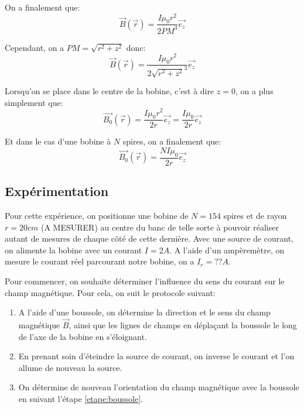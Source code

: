 \documentclass[12pt]{article}
\begin{document}
On a finalement que:
\begin{equation}
    \vec{B}(\vec{r}) = \frac{I \mu_0 r^2}{2 PM^3} \vec{e_z}
\end{equation}

Cependant, on a $PM = \sqrt{r^2 + z^2}$ donc:
\begin{equation}
    \vec{B}(\vec{r}) = \frac{I \mu_0 r^2}{2 \sqrt{r^2 + z^2}^3} \vec{e_z}
\end{equation}

Lorsqu'on se place dans le centre de la bobine, c'est à dire $z = 0$, on a plus simplement que:
\begin{equation}
    \vec{B_0}(\vec{r}) = \frac{I \mu_0 r^2}{2r} \vec{e_z} = \frac{I \mu_0}{2r} \vec{e_z}
\end{equation}

Et dans le cas d'une bobine à $N$ spires, on a finalement que:
\begin{equation}
    \vec{B_0}(\vec{r}) = \frac{N I \mu_0}{2r} \vec{e_z}
\end{equation}

\subsection{Expérimentation}
Pour cette expérience, on positionne une bobine de $N = 154$ spires et de rayon $r = 20cm$ (A MESURER) au centre du banc de telle sorte à pouvoir réaliser
autant de mesures de chaque côté de cette dernière. Avec une source de courant, on alimente la bobine avec 
un courant $I = 2A$. A l'aide d'un ampèremètre, on mesure le courant réel parcourant notre bobine, on a $I_r = ?? A$.

Pour commencer, on souhaite déterminer l'influence du sens du courant sur le champ magnétique. Pour cela, on suit le protocole
suivant:

\begin{enumerate}
    \item A l'aide d'une boussole, on détermine la direction et le sens du champ magnétique $\vec{B}$, ainsi que les lignes de champs
    en déplaçant la boussole le long de l'axe de la bobine en s'éloignant. \label{etape:boussole}
    \item En prenant soin d'éteindre la source de courant, on inverse le courant et l'on allume de nouveau la source.
    \item On détermine de nouveau l'orientation du champ magnétique avec la boussole en suivant l'étape \ref{etape:boussole}. 
\end{enumerate}
\end{document}
